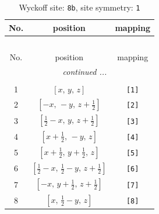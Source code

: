 \documentclass[fleqn,8pt]{jsarticle}
\begin{document}
\begin{longtable}{ccc}
\caption{Wyckoff site: {\tt 8b}, site symmetry: {\tt 1}}
 \\
 \hline \hline
No. & position & mapping \\ \hline \endfirsthead

\multicolumn{2}{l}{\tablename\ \thetable{}} \\
 \hline \hline
No. & position & mapping \\ \hline \endhead

 \hline \hline
\multicolumn{2}{r}{\footnotesize\it continued ...} \\ \endfoot

 \hline \hline
\multicolumn{2}{r}{} \\ \endlastfoot

1 & $\left[ x,\, y,\, z \right]$ & {\tt [1]} \\ \hline
2 & $\left[ - x,\, - y,\, z + \frac{1}{2} \right]$ & {\tt [2]} \\ \hline
3 & $\left[ \frac{1}{2} - x,\, y,\, z + \frac{1}{2} \right]$ & {\tt [3]} \\ \hline
4 & $\left[ x + \frac{1}{2},\, - y,\, z \right]$ & {\tt [4]} \\ \hline
5 & $\left[ x + \frac{1}{2},\, y + \frac{1}{2},\, z \right]$ & {\tt [5]} \\ \hline
6 & $\left[ \frac{1}{2} - x,\, \frac{1}{2} - y,\, z + \frac{1}{2} \right]$ & {\tt [6]} \\ \hline
7 & $\left[ - x,\, y + \frac{1}{2},\, z + \frac{1}{2} \right]$ & {\tt [7]} \\ \hline
8 & $\left[ x,\, \frac{1}{2} - y,\, z \right]$ & {\tt [8]} \\
\end{longtable}
\end{document}
